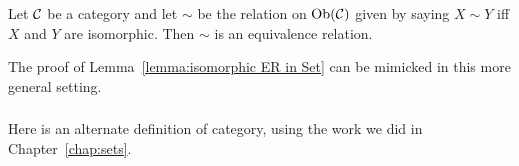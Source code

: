 \documentclass[CT4S-EN-RU]{subfiles}
\begin{document}
\begin{exerciseRUS}
\end{exerciseRUS}

\begin{lemmaENG}\label{lemma:isomorphic ER}
Let $\mathcal{C}$ be a category and let $\sim$ be the relation on $\textnormal{Ob}(\mathcal{C})$ given by saying $X\sim Y$ iff $X$ and $Y$ are isomorphic. Then $\sim$ is an equivalence relation.
\end{lemmaENG}

\begin{lemmaRUS}\label{lemma:isomorphic ER}
\end{lemmaRUS}

\begin{proofENG}
The proof of Lemma~\ref{lemma:isomorphic ER in Set} can be mimicked in this more general setting.
\end{proofENG}

\begin{proofRUS}
\end{proofRUS}


\subsubsection{}

\begin{blockENG}
Here is an alternate definition of category, using the work we did in Chapter~\ref{chap:sets}.
\end{blockENG}

\begin{blockRUS}
\end{blockRUS}
\end{document}
